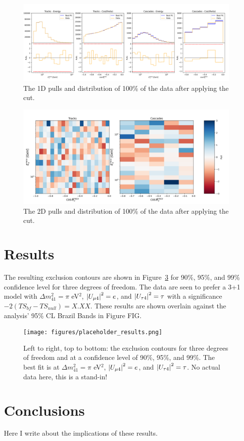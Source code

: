 \documentclass[main.tex]{subfiles}
\begin{document}
\begin{figure}
    \centering
    \includegraphics[width=0.9\linewidth]{./figures/blindfit/goodness_joint_data_full_cut_IC86_data_full_cut.png}
    \caption{The 1D pulls and distribution of 100\% of the data after applying the cut.}\label{fig:1d_100p_distrib_cut}
\end{figure}

\begin{figure}
    \centering
    \includegraphics[width=0.9\linewidth]{./figures/blindfit/2dpulls_joint_data_full_cut_IC86_data_full_cut.png}
    \caption{The 2D pulls and distribution of 100\% of the data after applying the cut.}\label{fig:2d_100p_distrib_cut}
\end{figure}


\section{Results}

The resulting exclusion contours are shown in Figure~\ref{fig:final_results} for 90\%, 95\%, and 99\% confidence level for three degrees of freedom. 
The data are seen to prefer a 3+1 model with $\Delta m_{41}^{2}=\pi$ eV$^{2}$, $\left| U_{\mu 4} \right|^{2}=e$, and $\left| U_{\tau 4} \right|^{2}=\tau$ with a significance $-2\left(TS_{bf} - TS_{null}\right)=X.XX$. 
These results are shown overlain against the analysis' 95\% CL Brazil Bands in Figure FIG. 


\begin{figure}
    \centering
    \texttt{[image: figures/placeholder\_results.png]}
    \caption{Left to right, top to bottom: the exclusion contours for three degrees of freedom and at a confidence level of 90\%, 95\%, and 99\%. The best fit is at $\Delta m_{41}^{2}=\pi$ eV$^{2}$, $\left| U_{\mu 4} \right|^{2}=e$, and $\left| U_{\tau 4} \right|^{2}=\tau$. No actual data here, this is a stand-in!}\label{fig:final_results}
\end{figure}

\section{Conclusions}

Here I write about the implications of these results. 
\end{document}
